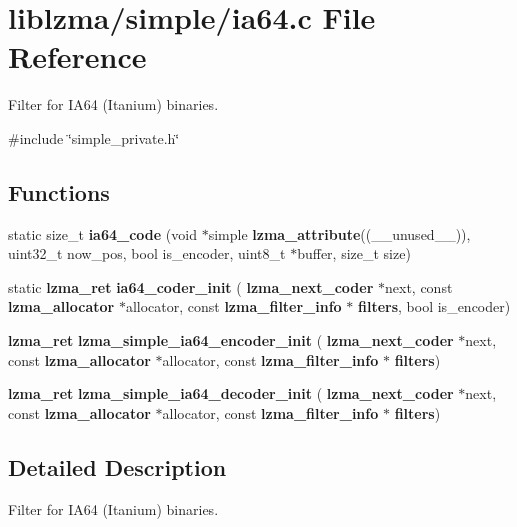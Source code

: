 \section{liblzma/simple/ia64.c File Reference}
\label{ia64_8c}


Filter for I\+A64 (Itanium) binaries.  


{\ttfamily \#include \char`\"{}simple\+\_\+private.\+h\char`\"{}}\newline
\subsection*{Functions}
\begin{DoxyCompactItemize}
\item 
\mbox{\label{ia64_8c_aaf8918ef42b95781dc7854b1305792e9}} 
static size\+\_\+t {\bfseries ia64\+\_\+code} (void $\ast$simple \textbf{ lzma\+\_\+attribute}((\+\_\+\+\_\+unused\+\_\+\+\_\+)), uint32\+\_\+t now\+\_\+pos, bool is\+\_\+encoder, uint8\+\_\+t $\ast$buffer, size\+\_\+t size)
\item 
\mbox{\label{ia64_8c_aa60b25a500a194640a8f6de214e218c2}} 
static \textbf{ lzma\+\_\+ret} {\bfseries ia64\+\_\+coder\+\_\+init} (\textbf{ lzma\+\_\+next\+\_\+coder} $\ast$next, const \textbf{ lzma\+\_\+allocator} $\ast$allocator, const \textbf{ lzma\+\_\+filter\+\_\+info} $\ast$\textbf{ filters}, bool is\+\_\+encoder)
\item 
\mbox{\label{ia64_8c_adea1b525998a8edea8a6165a5249c1e1}} 
\textbf{ lzma\+\_\+ret} {\bfseries lzma\+\_\+simple\+\_\+ia64\+\_\+encoder\+\_\+init} (\textbf{ lzma\+\_\+next\+\_\+coder} $\ast$next, const \textbf{ lzma\+\_\+allocator} $\ast$allocator, const \textbf{ lzma\+\_\+filter\+\_\+info} $\ast$\textbf{ filters})
\item 
\mbox{\label{ia64_8c_a0377d89310e72226e2b38b19c051568d}} 
\textbf{ lzma\+\_\+ret} {\bfseries lzma\+\_\+simple\+\_\+ia64\+\_\+decoder\+\_\+init} (\textbf{ lzma\+\_\+next\+\_\+coder} $\ast$next, const \textbf{ lzma\+\_\+allocator} $\ast$allocator, const \textbf{ lzma\+\_\+filter\+\_\+info} $\ast$\textbf{ filters})
\end{DoxyCompactItemize}


\subsection{Detailed Description}
Filter for I\+A64 (Itanium) binaries. 

